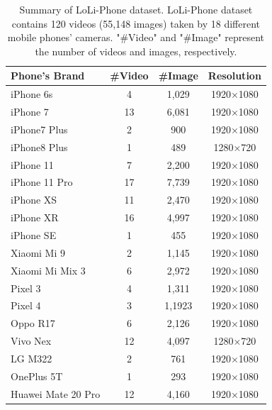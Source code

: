 \documentclass[letterpaper,12pt]{article}
\begin{document}
		\begin{table}[!htbp]
		\centering
		\tiny
			\begin{tabular}{>{\centering\arraybackslash}m{2.5cm}|c|c|c}
				
				\hline
				
				\textbf{Phone's Brand} & \textbf{\#Video} & \textbf{\#Image} & \textbf{Resolution} \\
				
				\hline
				
				iPhone 6s   		& 4 & 1,029	& 1920×1080 \\
				iPhone 7 	 		& 13& 6,081 & 1920×1080 \\
				iPhone7 Plus		& 2 & 900   & 1920×1080 \\
				iPhone8 Plus 		& 1 & 489   & 1280×720  \\
				iPhone 11   		& 7 & 2,200 & 1920×1080 \\
				iPhone 11 Pro 		& 17& 7,739 & 1920×1080 \\
				iPhone XS 	 		& 11& 2,470 & 1920×1080 \\
				iPhone XR 			& 16& 4,997 & 1920×1080 \\
				iPhone SE 			& 1 & 455   & 1920×1080 \\
				Xiaomi Mi 9	 		& 2 & 1,145 & 1920×1080 \\
				Xiaomi Mi Mix 3     & 6 & 2,972 & 1920×1080 \\
				Pixel 3   			& 4 & 1,311 & 1920×1080 \\
				Pixel 4   			& 3 & 1,1923& 1920×1080 \\
				Oppo R17 			& 6 & 2,126 & 1920×1080 \\
				Vivo Nex 	 		& 12& 4,097 & 1280×720  \\
				LG M322      		& 2 & 761   & 1920×1080 \\
				OnePlus 5T   		& 1 & 293   & 1920×1080 \\
				Huawei Mate 20 Pro 	& 12& 4,160 & 1920×1080 \\
				
				\hline
				
			\end{tabular}
		\captionsetup{font=scriptsize} %
		\caption{\label{tab: LoLi-Phone dataset}
			Summary of LoLi-Phone dataset. LoLi-Phone dataset contains 120 videos (55,148 images) taken by 18 different mobile phones' cameras. "\#Video" and "\#Image" represent the number of videos and images, respectively.} %
		
	\end{table}
	
\end{document}
